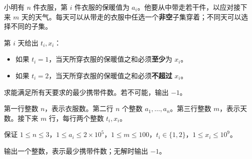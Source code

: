 \Legend
小明有 $n$ 件衣服，第 $i$ 件衣服的保暖值为 $a_i$。他要从中带走若干件，以应对接下来 $m$ 天的天气。每天可以从带走的衣服中任选一个\textbf{非空}子集穿着；不同天可以选择不同的子集。

第 $i$ 天给出 $t_i,x_i$：

\begin{itemize}
\item 如果 $t_i=1$，当天所穿衣服的保暖值之和必须\textbf{至少}为 $x_i$。
\item 如果 $t_i=2$，当天所穿衣服的保暖值之和必须\textbf{不超过} $x_i$。
\end{itemize}
求能满足所有天要求的最少携带件数。若不可能，输出 $-1$。

\Input

第一行整数 $n$，表示衣服数。第二行 $n$ 个整数 $a_1,\ldots,a_n$。第三行整数 $m$，表示天数。接下来 $m$ 行，每行两个整数 $t_i,x_i$。

保证 $1\le n\le3$，$1\le a_i\le2\times10^5$，$1\le m\le100$，$t_i\in\{1,2\}$，$1\le x_i\le10^9$。

\Output

输出一个整数，表示最少携带件数；无解时输出 $-1$。

\Examples

\begin{example}
\end{example}

\begin{example}
\end{example}

\begin{example}
\end{example}

\begin{example}
\end{example}

\begin{example}
\end{example}
